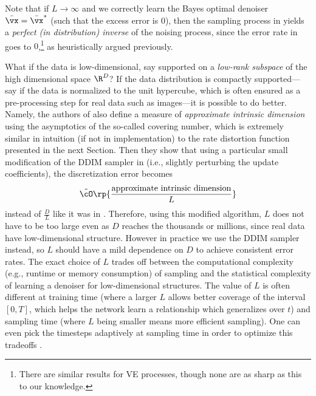 \documentclass[../../book-main.tex]{subfiles}
\begin{document}
Note that if \(L \to \infty\) and we correctly learn the Bayes optimal denoiser \(\bar{\vx} = \bar{\vx}^{\ast}\) (such that the excess error is \(0\)), then the sampling process in  yields a \textit{perfect (in distribution) inverse} of the noising process, since the error rate in  goes to \(0\),\footnote{There are similar results for VE processes, though none are as sharp as this to our knowledge.} as heuristically argued previously.

\begin{remark}
	What if the data is low-dimensional, say supported on a \textit{low-rank subspace} of the high dimensional space \(\R^{D}\)? If the data distribution is compactly supported---say if the data is normalized to the unit hypercube, which is often ensured as a pre-processing step for real data such as images---it is possible to do better. Namely, the authors of \cite{li2024d} also define a measure of \textit{approximate intrinsic dimension} using the asymptotics of the so-called covering number, which is extremely similar in intuition (if not in implementation) to the rate distortion function presented in the next Section. Then they show that using a particular small modification of the DDIM sampler in  (i.e., slightly perturbing the update coefficients), the discretization error becomes
	\begin{equation}
		\tilde{\cO}\rp{\frac{\text{approximate intrinsic dimension}}{L}}
	\end{equation}
	instead of \(\frac{D}{L}\) like it was in . Therefore, using this modified algorithm, \(L\) does not have to be too large even as \(D\) reaches the thousands or millions, since real data have low-dimensional structure. However in practice we use the DDIM sampler instead, so \(L\) should have a mild dependence on \(D\) to achieve consistent error rates. The exact choice of \(L\) trades off between the computational complexity (e.g., runtime or memory consumption) of sampling and the statistical complexity of learning a denoiser for low-dimensional structures. The value of \(L\) is often different at training time (where a larger \(L\) allows better coverage of the interval \([0, T]\), which helps the network learn a relationship which generalizes over \(t\)) and sampling time (where \(L\) being smaller means more efficient sampling). One can even pick the timesteps adaptively at sampling time in order to optimize this tradeoffs \cite{bao2022analytic}.
\end{remark}
\end{document}
